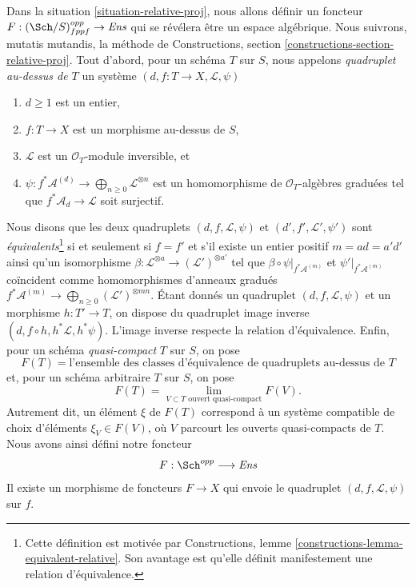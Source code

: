 \noindent
Dans la situation \ref{situation-relative-proj}, nous allons définir
un foncteur $F : (\Sch/S)_{fppf}^{opp} \to \textit{Ens}$ qui se révélera
être un espace algébrique. Nous suivrons, mutatis mutandis,
la méthode de
Constructions, section \ref{constructions-section-relative-proj}.
Tout d'abord, pour un schéma $T$ sur $S$, nous appelons
{\it quadruplet au-dessus de $T$} un système
$(d, f : T \to X, \mathcal{L}, \psi)$
\begin{enumerate}
\item $d \geq 1$ est un entier,
\item $f : T \to X$ est un morphisme au-dessus de $S$,
\item $\mathcal{L}$ est un $\mathcal{O}_T$-module inversible, et
\item
$\psi : f^*\mathcal{A}^{(d)} \to \bigoplus_{n \geq 0}\mathcal{L}^{\otimes n}$
est un homomorphisme de $\mathcal{O}_T$-algèbres graduées
tel que $f^*\mathcal{A}_d \to \mathcal{L}$ soit surjectif.
\end{enumerate}
Nous disons que les deux quadruplets $(d, f, \mathcal{L}, \psi)$ et
$(d', f', \mathcal{L}', \psi')$ sont {\it équivalents}\footnote{Cette
définition est motivée par
Constructions, lemme \ref{constructions-lemma-equivalent-relative}.
Son avantage est qu'elle définit manifestement
une relation d'équivalence.}
si et seulement si
$f = f'$ et s'il existe un entier positif $m = ad = a'd'$
ainsi qu'un isomorphisme
$\beta : \mathcal{L}^{\otimes a} \to (\mathcal{L}')^{\otimes a'}$
tel que $\beta \circ \psi|_{f^*\mathcal{A}^{(m)}}$ et
$\psi'|_{f^*\mathcal{A}^{(m)}}$ coïncident
comme homomorphismes d'anneaux gradués
$f^*\mathcal{A}^{(m)} \to \bigoplus_{n \geq 0} (\mathcal{L}')^{\otimes mn}$.
Étant donnés un quadruplet $(d, f, \mathcal{L}, \psi)$
et un morphisme $h : T' \to T$, on dispose du quadruplet image inverse
$(d, f \circ h, h^*\mathcal{L}, h^*\psi)$. L'image inverse respecte
la relation d'équivalence. Enfin, pour un schéma {\it quasi-compact} $T$
sur $S$, on pose
$$
F(T) = \text{l'ensemble des classes d'équivalence de quadruplets au-dessus de }T
$$
et, pour un schéma arbitraire $T$ sur $S$, on pose
$$
F(T)
=
\lim_{V \subset T\text{ ouvert quasi-compact}} F(V).
$$
Autrement dit, un élément $\xi$ de $F(T)$ correspond à un système
compatible de choix d'éléments $\xi_V \in F(V)$, où $V$ parcourt les
ouverts quasi-compacts de $T$. Nous avons ainsi défini notre foncteur
\begin{equation}
\label{equation-proj}
F : \Sch^{opp} \longrightarrow \textit{Ens}
\end{equation}
Il existe un morphisme de foncteurs $F \to X$ qui envoie le quadruplet
$(d, f, \mathcal{L}, \psi)$ sur $f$.

